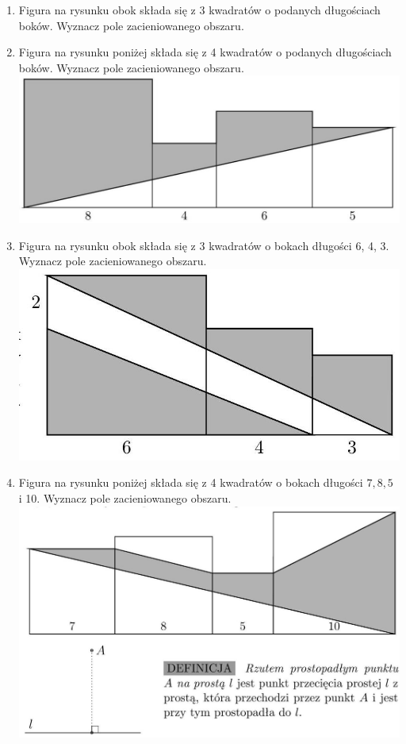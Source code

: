 \documentclass[10pt]{article}
\begin{document}
\begin{enumerate}
  \item Figura na rysunku obok składa się z 3 kwadratów o podanych długościach boków. Wyznacz pole zacieniowanego obszaru.
  \item Figura na rysunku poniżej składa się z 4 kwadratów o podanych długościach boków. Wyznacz pole zacieniowanego obszaru.\\
\includegraphics[max width=\textwidth, center]{2024_11_21_71f62bd117d375398909g-029(2)}
  \item Figura na rysunku obok składa się z 3 kwadratów o bokach długości 6, 4, 3. Wyznacz pole zacieniowanego obszaru.\\
\includegraphics[max width=\textwidth, center]{2024_11_21_71f62bd117d375398909g-029(1)}
  \item Figura na rysunku poniżej składa się z 4 kwadratów o bokach długości \(7,8,5\) i 10. Wyznacz pole zacieniowanego obszaru.\\
\includegraphics[max width=\textwidth, center]{2024_11_21_71f62bd117d375398909g-030(2)}
\end{enumerate}
\end{document}
